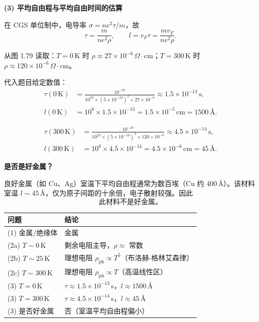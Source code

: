 \begin{derivationbox}[标准解题过程]
\textbf{(3) 平均自由程与平均自由时间的估算}

在 CGS 单位制中，电导率 $\sigma=ne^2\tau/m$，故
\begin{equation}
\tau=\frac{m}{ne^2\rho},\qquad l=v_F\tau=\frac{mv_F}{ne^2\rho}.
\end{equation}

从图 1.79 读取：$T=0\,$K 时 $\rho\approx27\times10^{-6}\,\Omega\cdot\text{cm}$；$T=300\,$K 时 $\rho\approx120\times10^{-6}\,\Omega\cdot\text{cm}$。

代入题目给定数值：
\begin{align}
\tau(0\,\text{K})&=\frac{10^{-27}}{10^{23}\times(5\times10^{-10})^2\times27\times10^{-6}}
\approx1.5\times10^{-13}\,\text{s},\\
l(0\,\text{K})&=10^8\times1.5\times10^{-13}=1.5\times10^{-5}\,\text{cm}=\boxed{1500\,\text{\AA}.}
\end{align}

\begin{align}
\tau(300\,\text{K})&=\frac{10^{-27}}{10^{23}\times(5\times10^{-10})^2\times120\times10^{-6}}
\approx4.5\times10^{-14}\,\text{s},\\
l(300\,\text{K})&=10^8\times4.5\times10^{-14}=4.5\times10^{-6}\,\text{cm}=\boxed{45\,\text{\AA}.}
\end{align}

\textbf{是否是好金属？}

良好金属（如 Cu、Ag）室温下平均自由程通常为数百埃（Cu 约 400\,\AA）。该材料室温 $l\sim45\,\text{\AA}$，仅为原子间距的十余倍，电子散射较强。因此
\begin{equation}
\boxed{\text{此材料不是好金属。}}
\end{equation}
\end{derivationbox}

\begin{formulabox}[答案汇总]
\begin{center}
\begin{tabular}{ll}
\toprule
\textbf{问题} & \textbf{结论} \\
\midrule
(1) 金属/绝缘体 & 金属 \\
(2a) $T\sim0\,$K & 剩余电阻主导，$\rho\approx$ 常数 \\
(2b) $T\sim25\,$K & 理想电阻 $\rho_{\text{ph}}\propto T^5$（布洛赫-格林艾森律） \\
(2c) $T\sim300\,$K & 理想电阻 $\rho_{\text{ph}}\propto T$（高温线性区） \\
(3) $T=0\,$K & $\tau\approx1.5\times10^{-13}\,$s，$l\approx1500\,\text{\AA}$ \\
(3) $T=300\,$K & $\tau\approx4.5\times10^{-14}\,$s，$l\approx45\,\text{\AA}$ \\
(3) 是否好金属 & 否（室温平均自由程偏小） \\
\bottomrule
\end{tabular}
\end{center}
\end{formulabox}


